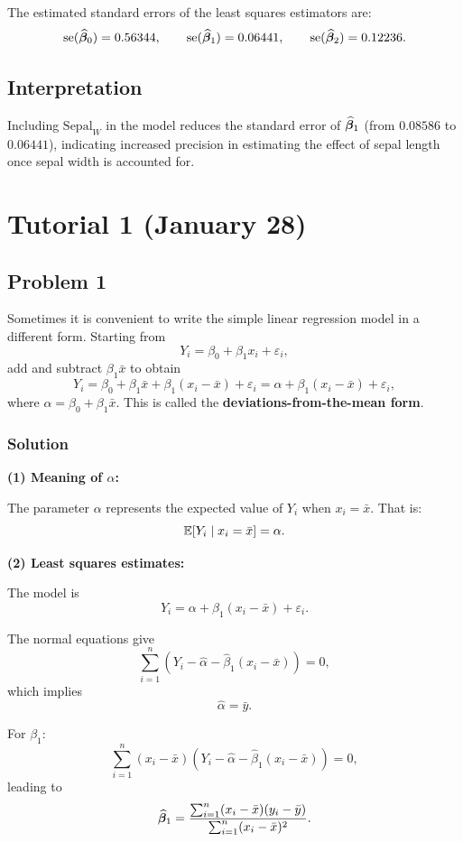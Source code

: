 The estimated standard errors of the least squares estimators are:
\[
\mathrm{se}(\widehat{\boldsymbol{\beta}}_0) = 0.56344,
\qquad
\mathrm{se}(\widehat{\boldsymbol{\beta}}_1) = 0.06441,
\qquad
\mathrm{se}(\widehat{\boldsymbol{\beta}}_2) = 0.12236.
\]

\subsection{Interpretation}

Including $\text{Sepal}_W$ in the model reduces the standard error of $\widehat{\boldsymbol{\beta}}_1$ (from $0.08586$ to $0.06441$), indicating increased precision in estimating the effect of sepal length once sepal width is accounted for.

\pagebreak

\section*{Tutorial 1 (January 28)}

\subsection{Problem 1}

Sometimes it is convenient to write the simple linear regression model in a different form. Starting from
\[
Y_i = \beta_0 + \beta_1 x_i + \varepsilon_i,
\]
add and subtract $\beta_1 \bar{x}$ to obtain
\[
Y_i = \beta_0 + \beta_1 \bar{x} + \beta_1(x_i - \bar{x}) + \varepsilon_i
= \alpha + \beta_1(x_i - \bar{x}) + \varepsilon_i,
\]
where $\alpha = \beta_0 + \beta_1 \bar{x}$. This is called the \textbf{deviations-from-the-mean form}.

\subsubsection*{Solution}

\textbf{(1) Meaning of $\alpha$:}

The parameter $\alpha$ represents the expected value of $Y_i$ when $x_i = \bar{x}$. That is:
\[
\mathbb{E}[Y_i \mid x_i = \bar{x}] = \alpha.
\]

\textbf{(2) Least squares estimates:}

The model is
\[
Y_i = \alpha + \beta_1(x_i - \bar{x}) + \varepsilon_i.
\]

The normal equations give
\[
\sum_{i=1}^n (Y_i - \hat{\alpha} - \hat{\beta}_1(x_i - \bar{x})) = 0,
\]
which implies
\[
\hat{\alpha} = \bar{y}.
\]

For $\beta_1$:
\[
\sum_{i=1}^n (x_i - \bar{x})(Y_i - \hat{\alpha} - \hat{\beta}_1(x_i - \bar{x})) = 0,
\]
leading to
\[
\widehat{\boldsymbol{\beta}}_1 =
\frac{\sum_{i=1}^n (x_i - \bar{x})(y_i - \bar{y})}
{\sum_{i=1}^n (x_i - \bar{x})^2}.
\]

